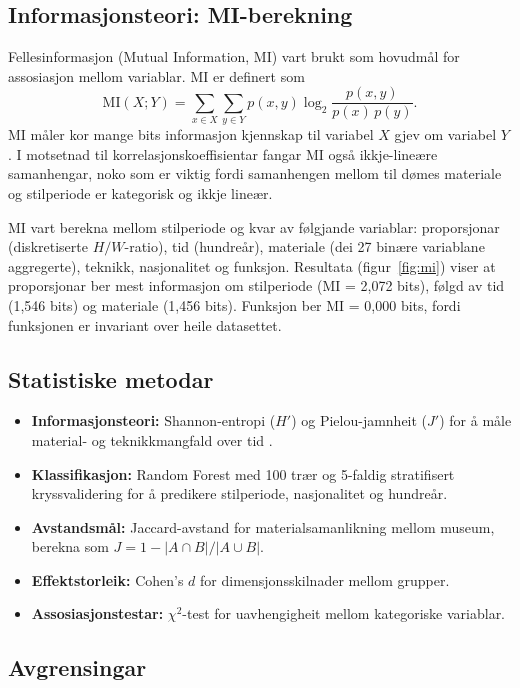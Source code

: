 \documentclass[12pt, a4paper]{article}
\begin{document}
\subsection{Informasjonsteori: MI-berekning}

Fellesinformasjon (Mutual Information, MI) vart brukt som hovudmål for assosiasjon mellom variablar. MI er definert som
\[
  \text{MI}(X;Y) = \sum_{x \in X} \sum_{y \in Y} p(x,y) \log_2 \frac{p(x,y)}{p(x)\,p(y)}.
\]
MI måler kor mange bits informasjon kjennskap til variabel $X$ gjev om variabel $Y$ \citep{cover2006}. I motsetnad til korrelasjonskoeffisientar fangar MI også ikkje-lineære samanhengar, noko som er viktig fordi samanhengen mellom til dømes materiale og stilperiode er kategorisk og ikkje lineær.

MI vart berekna mellom stilperiode og kvar av følgjande variablar: proporsjonar (diskretiserte $H/W$-ratio), tid (hundreår), materiale (dei 27 binære variablane aggregerte), teknikk, nasjonalitet og funksjon. Resultata (figur~\ref{fig:mi}) viser at proporsjonar ber mest informasjon om stilperiode (MI = 2,072 bits), følgd av tid (1,546 bits) og materiale (1,456 bits). Funksjon ber MI = 0,000 bits, fordi funksjonen er invariant over heile datasettet.

\subsection{Statistiske metodar}

\begin{itemize}
  \item \textbf{Informasjonsteori:} Shannon-entropi ($H'$) og Pielou-jamnheit ($J'$) for å måle material- og teknikkmangfald over tid \citep{shannon1948, pielou1966, magurran2004}.
  \item \textbf{Klassifikasjon:} Random Forest \citep{breiman2001} med 100 trær og 5-faldig stratifisert kryssvalidering for å predikere stilperiode, nasjonalitet og hundreår.
  \item \textbf{Avstandsmål:} Jaccard-avstand for materialsamanlikning mellom museum, berekna som $J = 1 - |A \cap B| / |A \cup B|$.
  \item \textbf{Effektstorleik:} Cohen's $d$ for dimensjonsskilnader mellom grupper.
  \item \textbf{Assosiasjonstestar:} $\chi^2$-test for uavhengigheit mellom kategoriske variablar.
\end{itemize}

\subsection{Avgrensingar}
\end{document}
